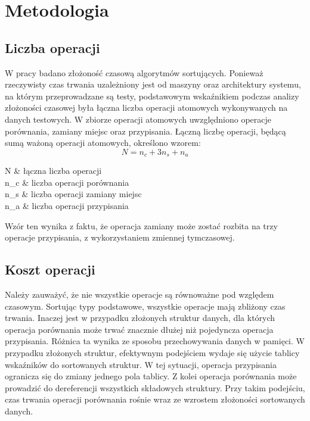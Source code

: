 \chapter{Metodologia}

\section{Liczba operacji}
W pracy badano złożoność czasową algorytmów sortujących. Ponieważ rzeczywisty czas trwania uzależniony jest od maszyny oraz architektury systemu, na którym przeprowadzane są testy, podstawowym wskaźnikiem podczas analizy złożoności czasowej była łączna liczba operacji atomowych wykonywanych na danych testowych. W zbiorze operacji atomowych uwzględniono operacje porównania, zamiany miejsc oraz przypisania. Łączną liczbę operacji, będącą sumą ważoną operacji atomowych, określono wzorem:\\
$$N = n_c + 3n_s + n_a $$

\begin{conditions}
	N		&  łączna liczba operacji 			\\
	n_c		&  liczba operacji porównania 		\\   
	n_s		&  liczba operacji zamiany miejsc 	\\
	n_a		&  liczba operacji przypisania		\\
\end{conditions}

Wzór ten wynika z faktu, że operacja zamiany może zostać rozbita na trzy operacje przypisania, z wykorzystaniem zmiennej tymczasowej.

\section{Koszt operacji}
Należy zauważyć, że nie wszystkie operacje są równoważne pod względem czasowym. Sortując typy podstawowe, wszystkie operacje mają zbliżony czas trwania. Inaczej jest w przypadku złożonych struktur danych, dla których operacja porównania może trwać znacznie dłużej niż pojedyncza operacja przypisania. Różnica ta wynika ze sposobu przechowywania danych w pamięci. W przypadku złożonych struktur, efektywnym podejściem wydaje się użycie tablicy wskaźników do sortowanych struktur. W tej sytuacji, operacja przypisania ogranicza się do zmiany jednego pola tablicy. Z kolei operacja porównania może prowadzić do dereferencji wszystkich składowych struktury. Przy takim podejściu, czas trwania operacji porównania rośnie wraz ze wzrostem złożoności sortowanych danych.\\

